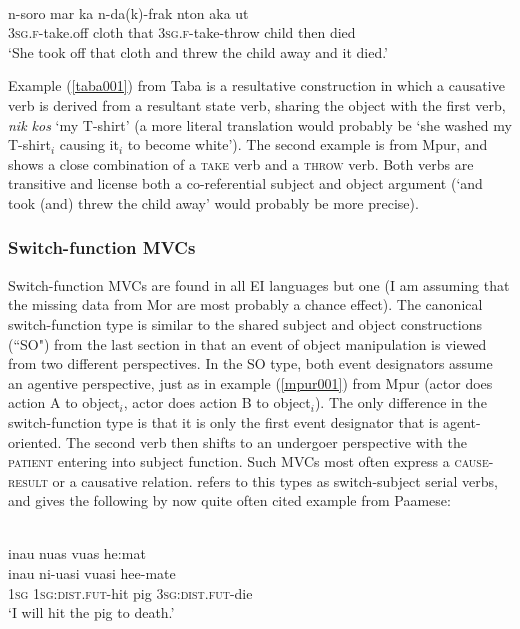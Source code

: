 \ea \label{mpur001}
\\
\gll n-soro mar ka n-da(k)-frak nton aka ut \\
3\textsc{sg}.\textsc{f}-take.off cloth that 3\textsc{sg}.\textsc{f}-take-throw child then died \\
\glft `She took off that cloth and threw the child away and it died.'\\ 
\z

Example (\ref{taba001}) from Taba is a resultative construction in which a causative verb is derived from a resultant state verb, sharing the object with the first verb, \textit{nik kos} `my T-shirt' (a more literal translation would probably be `she washed my T-shirt$_i$ causing it$_i$ to become white'). The second example is from Mpur, and shows a close combination of a \textsc{take} verb and a \textsc{throw} verb. Both verbs are transitive and license both a co-referential subject and object argument (`and took (and) threw the child away' would probably be more precise).

\subsubsection{Switch-function MVCs}

Switch-function MVCs are found in all EI languages but one (I am assuming that the missing data from Mor are most probably a chance effect). The canonical switch-function type is similar to the shared subject and object constructions (``SO") from the last section in that an event of object manipulation is viewed from two different perspectives. In the SO type, both event designators assume an agentive perspective, just as in example (\ref{mpur001}) from Mpur (actor does action A to object$_i$, actor does action B to object$_i$). The only difference in the switch-function type is that it is only the first event designator that is agent-oriented. The second verb then shifts to an undergoer perspective with the \textsc{patient} entering into subject function. Such MVCs most often express a \textsc{cause-result} or a causative relation. \citet{crowley2002serial} refers to this types as switch-subject serial verbs, and gives the following by now quite often cited example from Paamese:

\ea \label{}
\\
\glll inau nuas vuas he:mat \\
inau ni-uasi vuasi hee-mate \\
1\textsc{sg} 1\textsc{sg}:\textsc{dist}.\textsc{fut}-hit pig 3\textsc{sg}:\textsc{dist}.\textsc{fut}-die \\
\glft `I will hit the pig to death.'\\ 
\z

